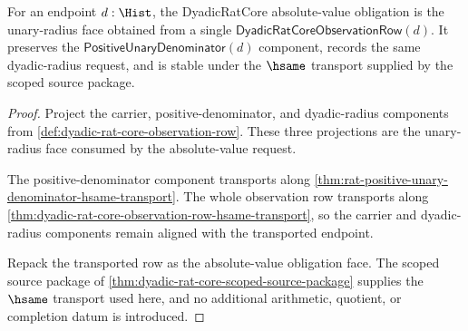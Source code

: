 \begin{theorem}
\label{thm:dyadic-rat-core-absolute-value-obligation}
For an endpoint $d:\Hist$, the DyadicRatCore absolute-value obligation is the
unary-radius face obtained from a single
$\mathsf{DyadicRatCoreObservationRow}(d)$. It preserves the
$\mathsf{PositiveUnaryDenominator}(d)$ component, records the same
dyadic-radius request, and is stable under the $\hsame$ transport supplied by
the scoped source package.
\end{theorem}
\begin{proof}
Project the carrier, positive-denominator, and dyadic-radius components from
\autoref{def:dyadic-rat-core-observation-row}. These three projections are the
unary-radius face consumed by the absolute-value request.

The positive-denominator component transports along
\autoref{thm:rat-positive-unary-denominator-hsame-transport}. The whole
observation row transports along
\autoref{thm:dyadic-rat-core-observation-row-hsame-transport}, so the carrier
and dyadic-radius components remain aligned with the transported endpoint.

Repack the transported row as the absolute-value obligation face. The scoped
source package of \autoref{thm:dyadic-rat-core-scoped-source-package} supplies
the $\hsame$ transport used here, and no additional arithmetic, quotient, or
completion datum is introduced.
\end{proof}

